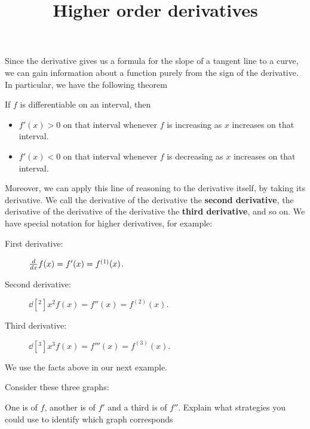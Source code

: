 \documentclass{ximera}
\title[Dig-In:]{Higher order derivatives}
\begin{document}
\begin{abstract}
  
\end{abstract}
\maketitle


Since the derivative gives us a formula for the slope of a tangent
line to a curve, we can gain information about a function purely from
the sign of the derivative.  In particular, we have the following theorem
\begin{theorem}
  If $f$ is differentiable on an interval, then
\begin{itemize}
\item $f'(x)>0$ on that interval whenever $f$ is increasing as $x$
  increases on that interval.
\item $f'(x)<0$ on that interval whenever $f$ is decreasing as $x$
  increases on that interval.
\end{itemize}
\end{theorem}
Moreover, we can apply this line of reasoning to the derivative
itself, by taking its derivative. We call the derivative of the
derivative the \textbf{second derivative}, the derivative of the
derivative of the derivative the \textbf{third derivative}, and so
on. We have special notation for higher derivatives, for example:
\begin{description}
\item[First derivative:] $\frac{d}{dx} f(x) = f'(x) = f^{(1)}(x)$.
\item[Second derivative:] $\dd[^2]{x^2} f(x) = f''(x) = f^{(2)}(x)$.
\item[Third derivative:] $\dd[^3]{x^3} f(x) = f'''(x) = f^{(3)}(x)$.
\end{description}

We use the facts above in our next example.

\begin{example}
  Consider these three graphs:
  \begin{image}
  \end{image}
  One is of $f$, another is of $f'$ and a third is of $f''$.  Explain
  what strategies you could use to identify which graph corresponds

\end{example}
\end{document}
